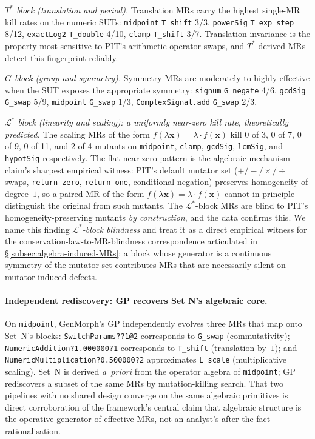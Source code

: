 \textit{$T^{*}$ block (translation and period).} Translation MRs carry
the highest single-MR kill rates on the numeric SUTs:
\texttt{midpoint} \texttt{T\_shift} 3/3, \texttt{powerSig}
\texttt{T\_exp\_step} 8/12, \texttt{exactLog2} \texttt{T\_double}
4/10, \texttt{clamp} \texttt{T\_shift} 3/7. Translation invariance is
the property most sensitive to PIT's arithmetic-operator swaps, and
$T^{*}$-derived MRs detect this fingerprint reliably.

\textit{$G$ block (group and symmetry).} Symmetry MRs are moderately
to highly effective when the SUT exposes the appropriate symmetry:
\texttt{signum} \texttt{G\_negate} 4/6, \texttt{gcdSig} \texttt{G\_swap}
5/9, \texttt{midpoint} \texttt{G\_swap} 1/3, \texttt{ComplexSignal.add}
\texttt{G\_swap} 2/3.

\textit{$\mathcal{L}^{*}$ block (linearity and scaling): a uniformly
near-zero kill rate, theoretically predicted.} The scaling MRs of the
form $f(\lambda \mathbf{x}) = \lambda \cdot f(\mathbf{x})$ kill 0 of
3, 0 of 7, 0 of 9, 0 of 11, and 2 of 4 mutants on \texttt{midpoint},
\texttt{clamp}, \texttt{gcdSig}, \texttt{lcmSig}, and \texttt{hypotSig}
respectively. The flat near-zero pattern is the algebraic-mechanism
claim's sharpest empirical witness: PIT's default mutator set
($+/-/\times/\div$ swaps, \texttt{return zero}, \texttt{return one},
conditional negation) preserves homogeneity of degree~$1$, so a paired
MR of the form $f(\lambda \mathbf{x}) = \lambda \cdot f(\mathbf{x})$
cannot in principle distinguish the original from such mutants. The
$\mathcal{L}^{*}$-block MRs are blind to PIT's homogeneity-preserving
mutants \emph{by construction}, and the data confirms this. We name
this finding \emph{$\mathcal{L}^{*}$-block blindness} and treat it as
a direct empirical witness for the conservation-law-to-MR-blindness
correspondence articulated in \S\ref{subsec:algebra-induced-MRs}: a
block whose generator is a continuous symmetry of the mutator set
contributes MRs that are necessarily silent on mutator-induced
defects.

\paragraph{Independent rediscovery: GP recovers Set N's algebraic core.}
On \texttt{midpoint}, GenMorph's GP independently evolves three MRs
that map onto Set~N's blocks: \texttt{SwitchParams??1@2} corresponds
to \texttt{G\_swap} (commutativity);
\texttt{NumericAddition?1.000000?1} corresponds to \texttt{T\_shift}
(translation by~$1$); and \texttt{NumericMultiplication?0.500000?2}
approximates \texttt{L\_scale} (multiplicative scaling). Set~N is
derived \emph{a~priori} from the operator algebra of \texttt{midpoint};
GP rediscovers a subset of the same MRs by mutation-killing search.
That two pipelines with no shared design converge on the same
algebraic primitives is direct corroboration of the framework's
central claim that algebraic structure is the operative generator of
effective MRs, not an analyst's after-the-fact rationalisation.

